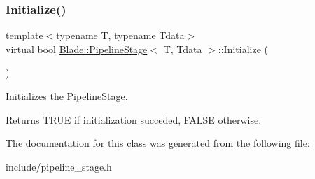 \subsubsection{\texorpdfstring{Initialize()}{Initialize()}}
{\footnotesize\ttfamily template$<$typename T, typename Tdata$>$ \\
virtual bool \hyperlink{class_blade_1_1_pipeline_stage}{Blade\+::\+Pipeline\+Stage}$<$ T, Tdata $>$\+::Initialize (\begin{DoxyParamCaption}{ }\end{DoxyParamCaption})\hspace{0.3cm}{\ttfamily [pure virtual]}}



Initializes the \hyperlink{class_blade_1_1_pipeline_stage}{Pipeline\+Stage}. 

\begin{DoxyReturn}{Returns}
T\+R\+UE if initialization succeded, F\+A\+L\+SE otherwise. 
\end{DoxyReturn}


The documentation for this class was generated from the following file\+:\begin{DoxyCompactItemize}
\item 
include/pipeline\+\_\+stage.\+h\end{DoxyCompactItemize}
